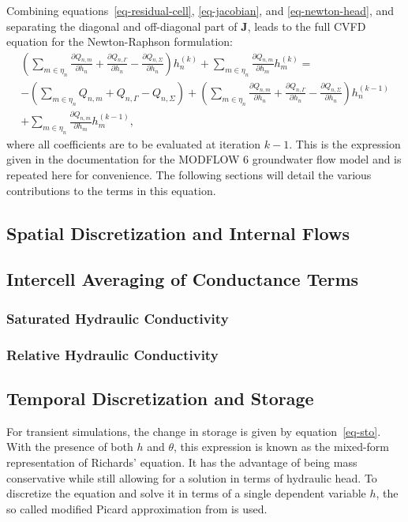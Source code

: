 \documentclass[fleqn]{article}
\begin{document}
Combining equations~\ref{eq-residual-cell}, \ref{eq-jacobian},
and \ref{eq-newton-head}, and separating the diagonal and
off-diagonal part of $\mathbf{J}$, leads to the full CVFD
equation for the Newton-Raphson formulation:
\begin{equation}
  \begin{split}
    \left(
      \sum_{m \in \eta_n} 
        \frac{\partial Q_{n,m}}{\partial h_n} + 
        \frac{\partial Q_{n, \Gamma}}{\partial h_n} - 
        \frac{\partial Q_{n,\Sigma}}{\partial h_n}
    \right) 
    h_n^{(k)} +
    \sum_{m \in \eta_n} \frac{\partial Q_{n,m}}{\partial h_m} 
    h_m^{(k)} =\\
    - 
    \left(
      \sum_{m \in \eta_n} Q_{n,m} + 
      Q_{n, \Gamma} - 
      Q_{n,\Sigma}
    \right) +
    \left(
      \sum_{m \in \eta_n} 
        \frac{\partial Q_{n,m}}{\partial h_n} + 
        \frac{\partial Q_{n, \Gamma}}{\partial h_n} - 
        \frac{\partial Q_{n,\Sigma}}{\partial h_n}
    \right) 
    h_n^{(k-1)}\\
    + \sum_{m \in \eta_n} \frac{\partial Q_{n,m}}{\partial h_m} 
    h_m^{(k-1)},
  \end{split}
\label{eq-cvfd-nr}
\end{equation}
where all coefficients are to be evaluated at iteration $k-1$. 
This is the expression given in the documentation for the
MODFLOW 6 groundwater flow model and is repeated here for
convenience. The following sections will detail the various
contributions to the terms in this equation.

\subsection{Spatial Discretization and Internal Flows}
\subsection{Intercell Averaging of Conductance Terms}\label{sec-cond-avg}
\subsubsection*{Saturated Hydraulic Conductivity}
\subsubsection*{Relative Hydraulic Conductivity}
\subsection{Temporal Discretization and Storage}
For transient simulations, the change in storage is given by
equation~\ref{eq-sto}. With the presence of both $h$ and $\theta$,
this expression is known as the mixed-form representation
of Richards' equation. It has the advantage of being mass
conservative while still allowing for a solution in terms
of hydraulic head. To discretize the equation and solve
it in terms of a single dependent variable $h$, the so called 
modified Picard approximation from \cite{celia-1990} is used.
\end{document}

